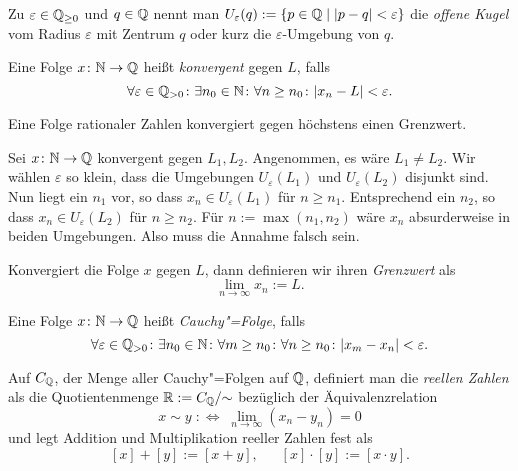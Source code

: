 \begin{Definition}\newlinefirst
Zu $\varepsilon\in\mathbb Q_{\ge 0}$ und $q\in\mathbb Q$ nennt man
$U_\varepsilon(q):=\{p\in\mathbb Q\mid |p-q|<\varepsilon\}$
die \emph{offene Kugel} vom Radius $\varepsilon$ mit Zentrum $q$ oder
kurz die $\varepsilon$-Umgebung von $q$.
\end{Definition}

\begin{Definition}\newlinefirst
Eine Folge $x\colon\mathbb N\to\mathbb Q$ heißt \emph{konvergent} gegen $L$, falls
\[\forall\varepsilon\in\mathbb Q_{>0}\colon\exists n_0\in\mathbb N\colon\forall n\ge n_0\colon |x_n-L| < \varepsilon.\]
\end{Definition}

\begin{Satz}
Eine Folge rationaler Zahlen konvergiert gegen höchstens einen Grenzwert.
\end{Satz}
\begin{Beweis}
Sei $x\colon\mathbb N\to\mathbb Q$ konvergent gegen $L_1,L_2$. Angenommen, es wäre $L_1\ne L_2$.
Wir wählen $\varepsilon$ so klein, dass die Umgebungen $U_\varepsilon(L_1)$
und $U_\varepsilon(L_2)$ disjunkt sind. Nun liegt ein $n_1$ vor,
so dass $x_n\in U_\varepsilon(L_1)$ für $n\ge n_1$. Entsprechend ein
$n_2$, so dass $x_n\in U_\varepsilon(L_2)$ für $n\ge n_2$. Für
$n:=\max(n_1,n_2)$ wäre $x_n$ absurderweise in beiden Umgebungen.
Also muss die Annahme falsch sein.\,\qedsymbol
\end{Beweis}

\begin{Definition}[Grenzwert]\newlinefirst
Konvergiert die Folge $x$ gegen $L$, dann definieren wir ihren \emph{Grenzwert} als
\[\lim_{n\to\infty} x_n := L.\]
\end{Definition}

\begin{Definition}\newlinefirst
Eine Folge $x\colon\mathbb N\to\mathbb Q$ heißt \emph{Cauchy"=Folge}, falls
\[\forall\varepsilon\in\mathbb Q_{>0}\colon\exists n_0\in\mathbb N\colon
\forall m\ge n_0\colon\forall n\ge n_0\colon |x_m - x_n| < \varepsilon.\]
\end{Definition}

\begin{Definition}\newlinefirst
Auf $C_\mathbb Q$, der Menge aller Cauchy"=Folgen auf $\mathbb Q$, definiert man
die \emph{reellen Zahlen} als die Quotientenmenge $\mathbb R:=C_\mathbb Q/{\sim}$
bezüglich der Äquivalenzrelation
\[x\sim y \;:\Leftrightarrow\; \lim_{n\to\infty}(x_n-y_n) = 0\]
und legt Addition und Multiplikation reeller Zahlen fest als
\[[x]+[y] := [x+y],\quad\;\; [x]\cdot [y] := [x\cdot y].\]
\end{Definition}

